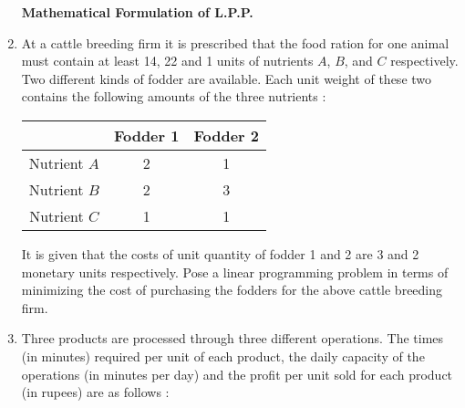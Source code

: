 \documentclass[11pt, a4paper]{article}
\begin{document}
\begin{enumerate}
\newpage

\begin{center}
\textbf{\huge Mathematical Formulation of L.P.P.}
\end{center}

\vspace{50pt}


\item At a cattle breeding firm it is prescribed that the food ration for one animal must contain at least 14, 22 and 1 units of nutrients $A$, $B$, and $C$ respectively. Two different kinds of fodder are available. Each unit weight of these two contains the following amounts of the three nutrients :

	\begin{table}[h]
	\def\arraystretch{1.5}
	
	\begin{center}
	\begin{tabular}{|c|c|c|}
	
	\hline
	
	& Fodder 1 & Fodder 2 \\
	
	\hline
	
	Nutrient $A$ & 2 & 1 \\
	
	\hline
	
	Nutrient $B$ & 2 & 3 \\
	
	\hline
	
	Nutrient $C$ & 1 & 1 \\
	
	\hline
	
	\end{tabular}
	\end{center}
	
	\end{table}
	
	It is given that the costs of unit quantity of fodder 1 and 2 are 3 and 2 monetary units respectively. Pose a linear programming problem in terms of minimizing the cost of purchasing the fodders for the above cattle breeding firm.
	
	
	
\vspace{40pt}
	
	
	

\item Three products are processed through three different operations. The times (in minutes) required per unit of each product, the daily capacity of the operations (in minutes per day) and the profit per unit sold for each product (in rupees) are as follows :


\end{enumerate}
\end{document}
